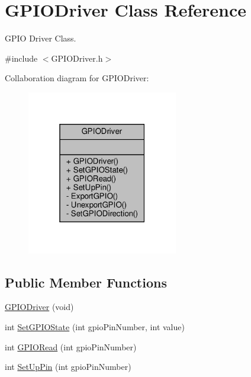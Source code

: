 \hypertarget{classGPIODriver}{}\section{G\+P\+I\+O\+Driver Class Reference}
\label{classGPIODriver}


G\+P\+IO Driver Class.  




{\ttfamily \#include $<$G\+P\+I\+O\+Driver.\+h$>$}



Collaboration diagram for G\+P\+I\+O\+Driver\+:\nopagebreak
\begin{figure}[H]
\begin{center}
\leavevmode
\includegraphics[width=187pt]{classGPIODriver__coll__graph}
\end{center}
\end{figure}
\subsection*{Public Member Functions}
\begin{DoxyCompactItemize}
\item 
\hyperlink{classGPIODriver_a74b0f69ce300c94de3d4fdd75042dec3}{G\+P\+I\+O\+Driver} (void)
\item 
int \hyperlink{classGPIODriver_a32a483cec3179d1d13acb1dad37b21ad}{Set\+G\+P\+I\+O\+State} (int gpio\+Pin\+Number, int value)
\item 
int \hyperlink{classGPIODriver_a68be60ab1fb0e9c29f60818654766a32}{G\+P\+I\+O\+Read} (int gpio\+Pin\+Number)
\item 
int \hyperlink{classGPIODriver_a314ce5622d8049f62b662b62fd3debe7}{Set\+Up\+Pin} (int gpio\+Pin\+Number)
\end{DoxyCompactItemize}
